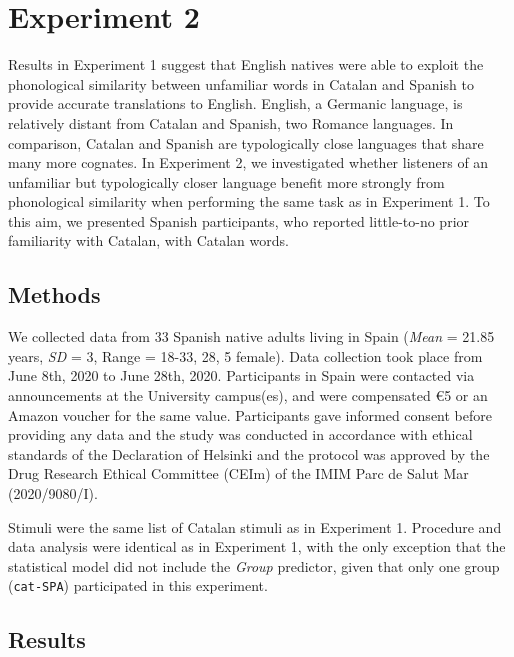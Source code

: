 \documentclass[
  man,
  longtable,
  nolmodern,
  notxfonts,
  notimes,
  colorlinks=true,linkcolor=blue,citecolor=blue,urlcolor=blue]{apa7}
\begin{document}
\section{Experiment 2}\label{experiment-2}

Results in Experiment 1 suggest that English natives were able to
exploit the phonological similarity between unfamiliar words in Catalan
and Spanish to provide accurate translations to English. English, a
Germanic language, is relatively distant from Catalan and Spanish, two
Romance languages. In comparison, Catalan and Spanish are typologically
close languages that share many more cognates. In Experiment 2, we
investigated whether listeners of an unfamiliar but typologically closer
language benefit more strongly from phonological similarity when
performing the same task as in Experiment 1. To this aim, we presented
Spanish participants, who reported little-to-no prior familiarity with
Catalan, with Catalan words.

\subsection{Methods}\label{methods-1}

We collected data from 33 Spanish native adults living in Spain
(\emph{Mean} = 21.85 years, \emph{SD} = 3, Range = 18-33, 28, 5 female).
Data collection took place from June 8th, 2020 to June 28th, 2020.
Participants in Spain were contacted via announcements at the University
campus(es), and were compensated €5 or an Amazon voucher for the same
value. Participants gave informed consent before providing any data and
the study was conducted in accordance with ethical standards of the
Declaration of Helsinki and the protocol was approved by the Drug
Research Ethical Committee (CEIm) of the IMIM Parc de Salut Mar
(2020/9080/I).

Stimuli were the same list of Catalan stimuli as in Experiment 1.
Procedure and data analysis were identical as in Experiment 1, with the
only exception that the statistical model did not include the
\emph{Group} predictor, given that only one group (\texttt{cat-SPA})
participated in this experiment.

\subsection{Results}\label{results-1}
\end{document}
